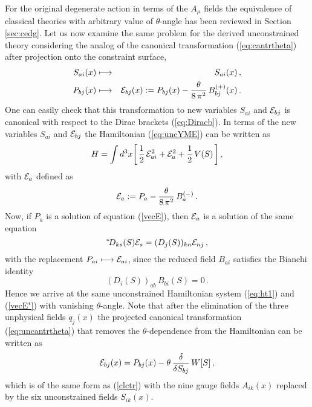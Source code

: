 \documentclass[a4paper,12pt]{article}
\newcommand{\nn}{\nonumber}
\begin{document}
For the original degenerate action in terms of the $A_{\mu}$ fields
the equivalence of classical theories
with arbitrary value of $\theta$-angle has been reviewed in
Section \ref{sec:cedg}.
Let us now examine the same problem for the derived unconstrained
theory considering the analog of the canonical transformation
(\ref{eq:cantrtheta}) after projection onto the constraint surface,
\begin{eqnarray}
S_{ai}(x) & \longmapsto & S_{ai}(x) \,, \nn\\
P_{bj}(x) & \longmapsto & {\cal E}_{bj}(x) :=
P_{bj}(x) - \frac{\theta}{8\,\pi^2}\, B^{(+)}_{bj}(x)\label{eq:uncantrtheta}\,.
\end{eqnarray}
One can easily check that this transformation
to new variables $S_{ai}$ and ${\cal E}_{bj}$
is canonical with respect to the Dirac brackets (\ref{eq:Diracb}).
In terms of the new variables $S_{ai}$ and ${\cal E}_{bj}$ the
Hamiltonian (\ref{eq:uncYME}) can be written as
\begin{equation}
\label{eq:ht1}
H =
\int d^3 x
\biggl[\,
\frac{1}{2}\, {\cal E}_{ai}^2 + {\cal E}_{a}^2 + \frac{1}{2}\, V(S) \,
\biggr]\,,
\end{equation}
with ${\cal E}_a$  defined as
\begin{equation}
{\cal E}_a := P_a - \frac{\theta}{8\, \pi^2} \, B^{(-)}_{a}\,.
\end{equation}
Now, if $P_a$ is a solution of equation (\ref{vecE}), then
${\cal E}_a$ is a solution of the same equation
\begin{equation}
\label{vecE"}
{}^\ast\! D_{ks}(S){\cal E} _s = (D_j(S))_{kn}{\cal E}_{nj}\,,
\end{equation}
with the replacement $P_{ai} \longmapsto {\cal E}_{ai}$,
since the reduced field $B_{ai}$ satisfies the Bianchi identity
\begin{equation}
\label{BI}
(D_i(S))_{ab} \, B_{bi}(S) = 0\,.
\end{equation}
Hence we arrive at the same unconstrained Hamiltonian system
(\ref{eq:ht1}) and (\ref{vecE"}) with vanishing $\theta$-angle.
Note that after the elimination of the three unphysical fields $q_j(x)$
the projected canonical transformation (\ref{eq:uncantrtheta})
that removes the $\theta$-dependence from the Hamiltonian can be written as
\begin{equation}
{\cal E}_{bj}(x) =
P_{bj}(x) - \theta \, \frac{\delta}{\delta S_{bj}}\, W[S]\,,
\end{equation}
which is of the same form as (\ref{clctr}) with the nine gauge fields
$A_{ik}(x)$ replaced by the six unconstrained fields $S_{ik}(x)$.
\end{document}
